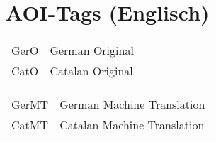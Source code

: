 \section*{AOI-Tags (Englisch)}

\begin{tabularx}{.5\textwidth}[t]{@{}lQ@{}}
GerO & German Original \\
CatO & Catalan Original \\
\end{tabularx}\begin{tabularx}{.5\textwidth}[t]{lQ@{}}
GerMT & German Machine Translation \\
CatMT & Catalan Machine Translation \\
\end{tabularx}
